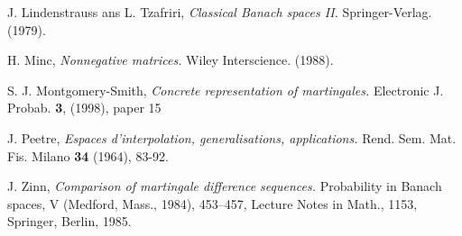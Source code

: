 \documentclass[12pt]{amsart}
\begin{document}
\begin{thebibliography}{10}
 J. Lindenstrauss ans L. Tzafriri, 
\textit{Classical Banach spaces II.} Springer-Verlag. (1979).

 H. Minc, \textit{Nonnegative matrices.} Wiley Interscience. (1988).

 S. J. Montgomery-Smith, \textit{Concrete representation of
martingales.} Electronic J. Probab. \textbf{3}, (1998), paper 15

 J. Peetre, \textit{Espaces d'interpolation, generalisations,
applications.} Rend. Sem. Mat. Fis. Milano \textbf{34} (1964),
83-92.

 J. Zinn, \textit{Comparison of martingale difference sequences.}
Probability in Banach spaces, V (Medford, Mass., 1984), 453--457, Lecture Notes
in Math., 1153, Springer, Berlin, 1985.

\end{thebibliography}
\end{document}
